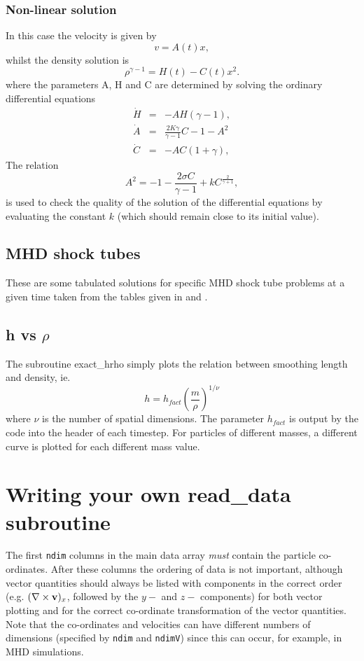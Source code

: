 \documentclass[a4paper,11pt]{article}
\begin{document}
\subsubsection{Non-linear solution}
In this case the velocity is given by
\begin{equation}
v = A(t) x,
\end{equation}
whilst the density solution is
\begin{equation}
\rho^{\gamma -1} = H(t) - C(t) x^2.
\end{equation}
where the parameters A, H and C are determined by solving the ordinary
differential equations
\begin{eqnarray}
\dot{H} & = & -AH(\gamma -1), \\
\dot{A} & = & \frac{2K \gamma}{\gamma -1} C - 1 - A^2 \\
\dot{C} & = & -AC(1+ \gamma),
\end{eqnarray}
The relation
\begin{equation}
A^2 = -1 - \frac{2 \sigma C}{\gamma -1} + kC^{\frac{2}{\gamma +1}},
\label{eq:kconst}
\end{equation}
is used to check the quality of the solution of the differential equations by
evaluating the constant $k$ (which should remain close to its initial value).

\subsection{MHD shock tubes}
 These are some tabulated solutions for specific MHD shock tube problems at a
given time taken from the tables given in \citet{dw94} and \citet{rj95}.

\subsection{h vs $\rho$}
 The subroutine exact\_hrho simply plots the relation between smoothing length
and density, ie.
\begin{equation}
h = h_{fact} \left(\frac{m}{\rho}\right)^{1/\nu}
\end{equation}
where $\nu$ is the number of spatial dimensions. The parameter $h_{fact}$ is
output by the code into the header of each timestep. For particles of different
masses, a different curve is plotted for each different mass value.

\newpage

\section{Writing your own read\_data subroutine}
\label{sec:writeyourown}
The first \verb+ndim+ columns in the main data array \emph{must} contain the particle co-ordinates.
After these columns the ordering of data is not important, although vector quantities should
always be listed with components in the correct order (e.g. $(\nabla\times {\bf v})_x$,
followed by the $y-$ and $z-$ components) for both vector plotting and for the
correct co-ordinate transformation of the vector quantities. Note that the co-ordinates and velocities can have different
numbers of dimensions (specified by \verb+ndim+ and \verb+ndimV+) since this can occur, for example, in MHD simulations.
\end{document}

